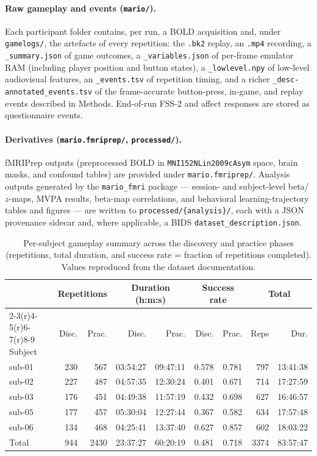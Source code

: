 \documentclass{article}
\begin{document}
\paragraph{Raw gameplay and events (\texttt{mario/}).}
Each participant folder contains, per run, a BOLD acquisition and, under \texttt{gamelogs/}, the
artefacts of every repetition: the \texttt{.bk2} replay, an \texttt{.mp4} recording, a
\texttt{\_summary.json} of game outcomes, a \texttt{\_variables.json} of per-frame emulator RAM
(including player position and button states), a \texttt{\_lowlevel.npy} of low-level
audiovisual features, an \texttt{\_events.tsv} of repetition timing, and a richer
\texttt{\_desc-annotated\_events.tsv} of the frame-accurate button-press, in-game, and replay
events described in Methods. End-of-run FSS-2 and affect responses are stored as
questionnaire events.

\paragraph{Derivatives (\texttt{mario.fmriprep/}, \texttt{processed/}).}
fMRIPrep outputs (preprocessed BOLD in \texttt{MNI152NLin2009cAsym} space, brain masks, and
confound tables) are provided under \texttt{mario.fmriprep/}. Analysis outputs generated by the
\texttt{mario\_fmri} package — session- and subject-level beta/$z$-maps, MVPA results,
beta-map correlations, and behavioral learning-trajectory tables and figures — are written to
\texttt{processed/\{analysis\}/}, each with a JSON provenance sidecar and, where applicable, a
BIDS \texttt{dataset\_description.json}.

\begin{table}[t]
  \caption{Per-subject gameplay summary across the discovery and practice phases (repetitions,
    total duration, and success rate = fraction of repetitions completed). Values reproduced from
    the dataset documentation.}
  \label{tab:behavior}
  \centering
  \small
  \begin{tabular}{lrrrrrrrr}
    \toprule
    & \multicolumn{2}{c}{Repetitions} & \multicolumn{2}{c}{Duration (h:m:s)} & \multicolumn{2}{c}{Success rate} & \multicolumn{2}{c}{Total} \\
    \cmidrule(r){2-3}\cmidrule(r){4-5}\cmidrule(r){6-7}\cmidrule(r){8-9}
    Subject & Disc. & Prac. & Disc. & Prac. & Disc. & Prac. & Reps & Dur. \\
    \midrule
    sub-01 & 230 & 567 & 03:54:27 & 09:47:11 & 0.578 & 0.781 & 797 & 13:41:38 \\
    sub-02 & 227 & 487 & 04:57:35 & 12:30:24 & 0.401 & 0.671 & 714 & 17:27:59 \\
    sub-03 & 176 & 451 & 04:49:38 & 11:57:19 & 0.432 & 0.698 & 627 & 16:46:57 \\
    sub-05 & 177 & 457 & 05:30:04 & 12:27:44 & 0.367 & 0.582 & 634 & 17:57:48 \\
    sub-06 & 134 & 468 & 04:25:41 & 13:37:40 & 0.627 & 0.857 & 602 & 18:03:22 \\
    \midrule
    Total  & 944 & 2430 & 23:37:27 & 60:20:19 & 0.481 & 0.718 & 3374 & 83:57:47 \\
    \bottomrule
  \end{tabular}
\end{table}
\end{document}
